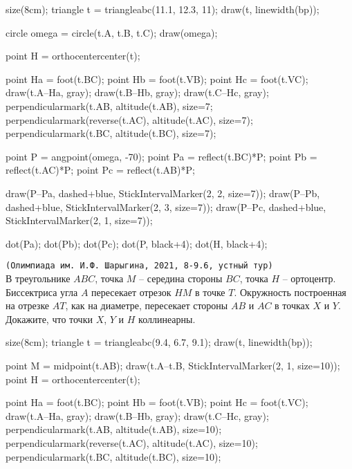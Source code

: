 \documentclass[12pt, twoside]{article}
\newcommand{\task}[2]{\texttt{(#1)} #2}
\begin{document}
\begin{multicols}{2}
\begin{tasks}
			\begin{center}
				\begin{asy}
				size(8cm); 
				triangle t = triangleabc(11.1, 12.3, 11); draw(t, linewidth(bp));
				
				circle omega = circle(t.A, t.B, t.C); draw(omega);
				
				point H = orthocentercenter(t); 
				
				point Ha = foot(t.BC);
				point Hb = foot(t.VB);
				point Hc = foot(t.VC);
				draw(t.A--Ha, gray);
				draw(t.B--Hb, gray);
				draw(t.C--Hc, gray);
				perpendicularmark(t.AB, altitude(t.AB), size=7;
				perpendicularmark(reverse(t.AC), altitude(t.AC), size=7);
				perpendicularmark(t.BC, altitude(t.BC), size=7);
				
				point P = angpoint(omega, -70); 
				point Pa = reflect(t.BC)*P;
				point Pb = reflect(t.AC)*P; 
				point Pc = reflect(t.AB)*P; 
				
				draw(P--Pa, dashed+blue, StickIntervalMarker(2, 2, size=7));
				draw(P--Pb, dashed+blue, StickIntervalMarker(2, 3, size=7));
				draw(P--Pc, dashed+blue, StickIntervalMarker(2, 1, size=7));
				
				
				
				
				dot(Pa);
				dot(Pb);
				dot(Pc);
				dot(P, black+4);
				dot(H, black+4);
				\end{asy}
			\end{center}
			
			\item \task{Олимпиада им. И.Ф. Шарыгина, 2021, 8-9.6, устный тур}{\\В треугольнике $ABC$, точка $M$ -- середина стороны $BC$, точка $H$ -- ортоцентр. Биссектриса угла $A$ пересекает отрезок $HM$ в точке $T$. Окружность построенная на отрезке $AT$, как на диаметре, пересекает стороны $AB$ и $AC$ в точках $X$ и $Y$. Докажите, что точки $X$, $Y$ и $H$  коллинеарны.}
			
			\begin{center}
				\begin{asy}
				size(8cm);
				triangle t = triangleabc(9.4, 6.7, 9.1);
				draw(t, linewidth(bp)); 
				
				point M = midpoint(t.AB);
				draw(t.A--t.B, StickIntervalMarker(2, 1, size=10));
				point H = orthocentercenter(t); 
				
				point Ha = foot(t.BC);
				point Hb = foot(t.VB);
				point Hc = foot(t.VC);
				draw(t.A--Ha, gray);
				draw(t.B--Hb, gray);
				draw(t.C--Hc, gray);
				perpendicularmark(t.AB, altitude(t.AB), size=10);
				perpendicularmark(reverse(t.AC), altitude(t.AC), size=10);
				perpendicularmark(t.BC, altitude(t.BC), size=10);
				

\end{asy}
\end{center}
\end{tasks}
\end{multicols}
\end{document}

